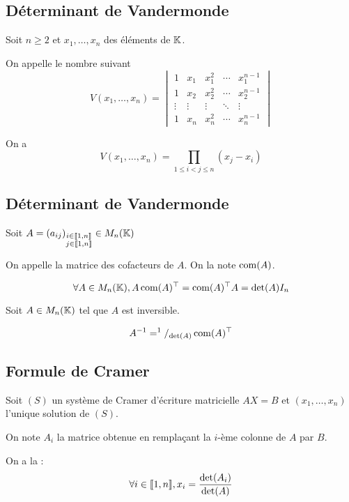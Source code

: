 \subsection{Déterminant de Vandermonde}

\begin{prp}
  Soit $n \geq 2$ et $x_1, \ldots, x_n$ des éléments de $\K$.

  On appelle  le nombre suivant
  \[
    V(x_1, \ldots, x_n) =
    \begin{vmatrix}
      1 & x_1 & x_1^2 & \cdots & x_1^{n - 1} \\
      1 & x_2 & x_2^2 & \cdots & x_2^{n - 1} \\
      \vdots & \vdots & \vdots & \ddots & \vdots \\
      1 & x_n & x_n^2 & \cdots & x_n^{n - 1}
    \end{vmatrix}
  \]

  On a
  \[
    V(x_1, \ldots, x_n) = \prod_{1 \leq i < j \leq n} ( x_j - x_i)
  \]
\end{prp}

\subsection{Déterminant de Vandermonde}

\begin{dfn}
  Soit $A = (a_{ij})_{\mind{i}{j}{n}{n}} \in M_n(\K)$

  On appelle  la matrice des cofacteurs
  de $A$. On la note $\com(A)$.
\end{dfn}

\begin{prp}
  \[
    \forall A \in M_n(\K), A \com(A)^\top = \com(A)^\top A = \det(A) I_n
  \]
\end{prp}

\begin{cor}
  Soit $A \in M_n(\K)$ tel que $A$ est inversible.

  \[
    A^{-1} = ^1/_{\det(A)} \com(A)^\top
  \]
\end{cor}

\subsection{Formule de Cramer}

\begin{prp}
  Soit $(S)$ un système de Cramer d'écriture matricielle $A X = B$ et
  $(x_1, \ldots, x_n)$ l'unique solution de $(S)$.

  On note $A_i$ la matrice obtenue en remplaçant la $i$-ème colonne
  de $A$ par $B$.
  
  On a la :
  \[
    \forall i \in \lib 1, n \rib, x_i = \frac{\det(A_i)}{\det(A)}
  \]
\end{prp}


